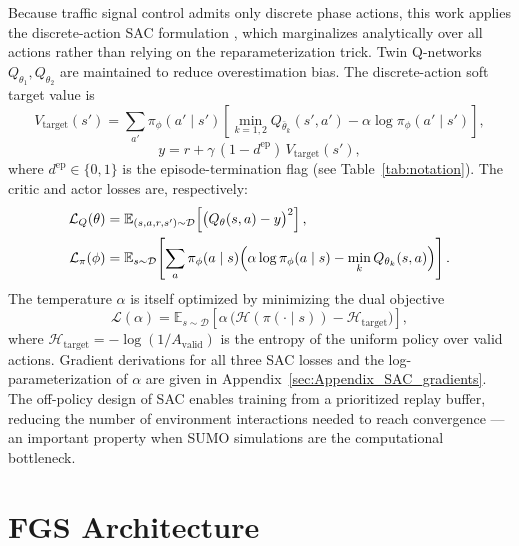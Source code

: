 Because traffic signal control admits only discrete phase actions, this work applies the discrete-action SAC formulation \citep{christodoulou2019soft}, which marginalizes analytically over all actions rather than relying on the reparameterization trick. Twin Q-networks $Q_{\theta_1}, Q_{\theta_2}$ are maintained to reduce overestimation bias. The discrete-action soft target value is
\begin{equation}
  V_{\mathrm{target}}(s') =
    \sum_{a'} \pi_\phi(a' \mid s')
    \!\left[
      \min_{k=1,2} Q_{\bar{\theta}_k}(s', a') - \alpha\log\pi_\phi(a' \mid s')
    \right],
  \label{eq:sac_target}
\end{equation}
\begin{equation}
  y = r + \gamma\,(1-d^{\mathrm{ep}})\,V_{\mathrm{target}}(s'),
  \label{eq:sac_td_target}
\end{equation}
where $d^{\mathrm{ep}} \in \{0,1\}$ is the episode-termination flag (see Table~\ref{tab:notation}). The critic and actor losses are, respectively:
\begin{align}
  \mathcal{L}_Q(\theta) &=
    \mathbb{E}_{(s,a,r,s')\sim\mathcal{D}}\!\left[
      \bigl(Q_\theta(s,a) - y\bigr)^2
    \right],
  \label{eq:sac_critic_loss}\\
  \mathcal{L}_\pi(\phi) &=
    \mathbb{E}_{s\sim\mathcal{D}}\!\left[
      \sum_{a}\pi_\phi(a \mid s)
      \Bigl(\alpha\log\pi_\phi(a \mid s) - \min_{k} Q_{\theta_k}(s,a)\Bigr)
    \right].
  \label{eq:sac_actor_loss}
\end{align}
The temperature $\alpha$ is itself optimized by minimizing the dual objective
\begin{equation}
  \mathcal{L}(\alpha) =
    \mathbb{E}_{s\sim\mathcal{D}}\!\left[
      \alpha\,\bigl(\mathcal{H}(\pi(\cdot \mid s)) - \mathcal{H}_{\mathrm{target}}\bigr)
    \right],
  \label{eq:sac_alpha_loss}
\end{equation}
where $\mathcal{H}_{\mathrm{target}} = -\!\log(1/A_{\mathrm{valid}})$ is the entropy of the uniform policy over valid actions. Gradient derivations for all three SAC losses and the log-parameterization of $\alpha$ are given in Appendix~\ref{sec:Appendix_SAC_gradients}. The off-policy design of SAC enables training from a prioritized replay buffer, reducing the number of environment interactions needed to reach convergence — an important property when SUMO simulations are the computational bottleneck.

\section{FGS Architecture}
\label{sec:Methodology_FGSArchitecture}


